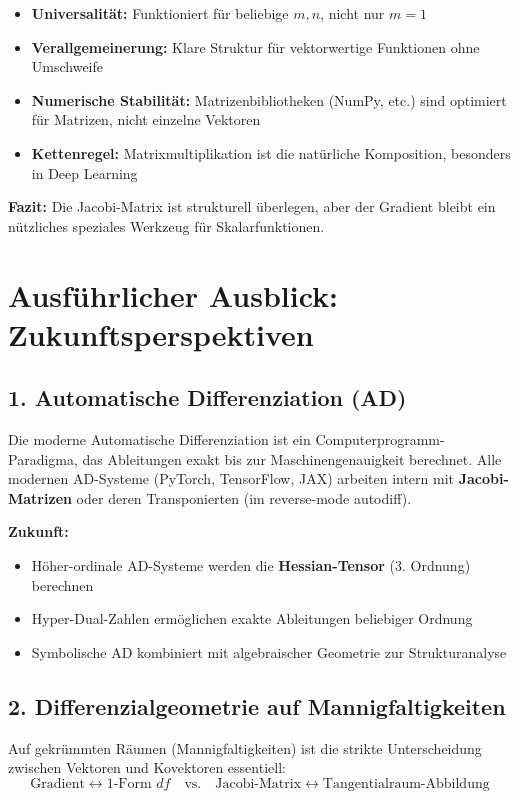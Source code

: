 ﻿\documentclass[a4paper,12pt]{article}
\theoremstyle{definition}
\begin{document}
\begin{itemize}
	\item \textbf{Universalität:} Funktioniert für beliebige $m, n$, nicht nur $m = 1$
	\item \textbf{Verallgemeinerung:} Klare Struktur für vektorwertige Funktionen ohne Umschweife
	\item \textbf{Numerische Stabilität:} Matrizenbibliotheken (NumPy, etc.) sind optimiert für Matrizen, nicht einzelne Vektoren
	\item \textbf{Kettenregel:} Matrixmultiplikation ist die natürliche Komposition, besonders in Deep Learning
\end{itemize}

\textbf{Fazit:} Die Jacobi-Matrix ist strukturell überlegen, aber der Gradient bleibt ein nützliches speziales Werkzeug für Skalarfunktionen.

\newpage

\section{Ausführlicher Ausblick: Zukunftsperspektiven}

\subsection{1. Automatische Differenziation (AD)}

Die moderne Automatische Differenziation ist ein Computerprogramm-Paradigma, das Ableitungen exakt bis zur Maschinengenauigkeit berechnet. Alle modernen AD-Systeme (PyTorch, TensorFlow, JAX) arbeiten intern mit \textbf{Jacobi-Matrizen} oder deren Transponierten (im reverse-mode autodiff).

\textbf{Zukunft:}
\begin{itemize}
	\item Höher-ordinale AD-Systeme werden die \textbf{Hessian-Tensor} (3. Ordnung) berechnen
	\item Hyper-Dual-Zahlen ermöglichen exakte Ableitungen beliebiger Ordnung
	\item Symbolische AD kombiniert mit algebraischer Geometrie zur Strukturanalyse
\end{itemize}

\subsection{2. Differenzialgeometrie auf Mannigfaltigkeiten}

Auf gekrümmten Räumen (Mannigfaltigkeiten) ist die strikte Unterscheidung zwischen Vektoren und Kovektoren essentiell:
\[
\text{Gradient} \leftrightarrow \text{1-Form } df \quad \text{vs.} \quad \text{Jacobi-Matrix} \leftrightarrow \text{Tangentialraum-Abbildung}
\]
\end{document}

